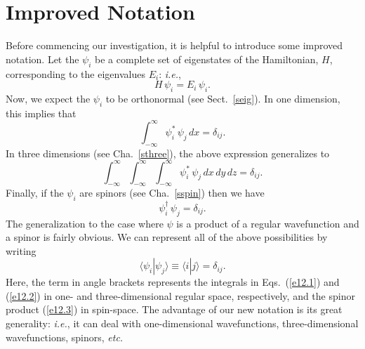 \section{Improved Notation}
Before commencing our investigation, it is helpful to introduce some
improved notation. Let the $\psi_i$ be a complete set of eigenstates
of the Hamiltonian, $H$, corresponding to the eigenvalues $E_i$:
{\em i.e.},
\begin{equation}
H\,\psi_i = E_i\,\psi_i.
\end{equation}
Now, we expect the $\psi_i$ to be orthonormal (see Sect.~\ref{seig}). 
In one dimension, this implies that
\begin{equation}\label{e12.1}
\int_{-\infty}^\infty \psi_i^\ast\,\psi_j\,dx = \delta_{ij}.
\end{equation}
In three dimensions (see Cha.~\ref{sthree}), the above expression generalizes to
\begin{equation}\label{e12.2}
\int_{-\infty}^\infty \int_{-\infty}^\infty \int_{-\infty}^\infty \psi_i^\ast\,\psi_j\,dx\,dy\,dz = \delta_{ij}.
\end{equation}
Finally, if the $\psi_i$ are spinors (see Cha.~\ref{sspin}) then
we have
\begin{equation}\label{e12.3}
\psi_i^\dag\,\psi_j = \delta_{ij}.
\end{equation}
The generalization to the case where $\psi$ is a product of a regular
wavefunction and a spinor is fairly obvious. We can represent all
of the above possibilities by writing
\begin{equation}
\langle \psi_i|\psi_j\rangle \equiv \langle i|j\rangle = \delta_{ij}.
\end{equation}
Here, the term in angle brackets represents the integrals in Eqs.~(\ref{e12.1})
and (\ref{e12.2}) in one- and three-dimensional regular space, respectively,
and the spinor product (\ref{e12.3}) in spin-space. The advantage of
our new notation is its great generality: {\em i.e.}, it
can deal with one-dimensional wavefunctions, three-dimensional wavefunctions,
spinors, {\em etc.}

